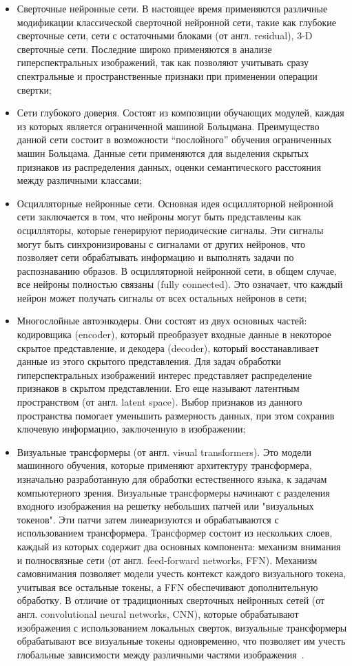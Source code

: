 \documentclass[14pt, russian]{scrartcl}
\begin{document}
\begin{itemize}
    \item Сверточные нейронные сети. В настоящее время применяются различные модификации классической сверточной нейронной сети, такие как глубокие сверточные сети, сети с остаточными блоками (от англ. residual), 3-D сверточные сети. Последние широко применяются в анализе гиперспектральных изображений, так как позволяют учитывать сразу спектральные и пространственные признаки при применении операции свертки;
    \item Сети глубокого доверия. Состоят из композиции обучающих модулей, каждая из которых является ограниченной машиной Больцмана. Преимущество данной сети состоит в возможности “послойного” обучения ограниченных машин Больцама. Данные сети применяются для выделения скрытых признаков из распределения данных, оценки семантического расстояния между различными классами;
    \item Осцилляторные нейронные сети. Основная идея осцилляторной нейронной сети заключается в том, что нейроны могут быть представлены как осцилляторы, которые генерируют периодические сигналы. Эти сигналы могут быть синхронизированы с сигналами от других нейронов, что позволяет сети обрабатывать информацию и выполнять задачи по распознаванию образов. В осцилляторной нейронной сети, в общем случае, все нейроны полностью связаны (fully connected). Это означает, что каждый нейрон может получать сигналы от всех остальных нейронов в сети;
    \item Многослойные автоэнкодеры. Они состоят из двух основных частей: кодировщика (encoder), который преобразует входные данные в некоторое скрытое представление, и декодера (decoder), который восстанавливает данные из этого скрытого представления. Для задач обработки гиперспектральных изображений интерес представляет распределение признаков в скрытом представлении. Его еще называют латентным пространством (от англ. latent space). Выбор признаков из данного пространства помогает уменьшить размерность данных, при этом сохранив ключевую информацию, заключенную в изображении;
    \item Визуальные трансформеры (от англ. visual transformers). Это модели машинного обучения, которые применяют архитектуру трансформера, изначально разработанную для обработки естественного языка, к задачам компьютерного зрения. Визуальные трансформеры начинают с разделения входного изображения на решетку небольших патчей или "визуальных токенов". Эти патчи затем линеаризуются и обрабатываются с использованием трансформера. Трансформер состоит из нескольких слоев, каждый из которых содержит два основных компонента: механизм внимания и полносвязные сети (от англ. feed-forward networks, FFN). Механизм самовнимания позволяет модели учесть контекст каждого визуального токена, учитывая все остальные токены, а FFN обеспечивают дополнительную обработку. В отличие от традиционных сверточных нейронных сетей (от англ. convolutional neural networks, CNN), которые обрабатывают изображения с использованием локальных сверток, визуальные трансформеры обрабатывают все визуальные токены одновременно, что позволяет им учесть глобальные зависимости между различными частями изображения~\cite{25}.
\end{itemize}
\end{document}
